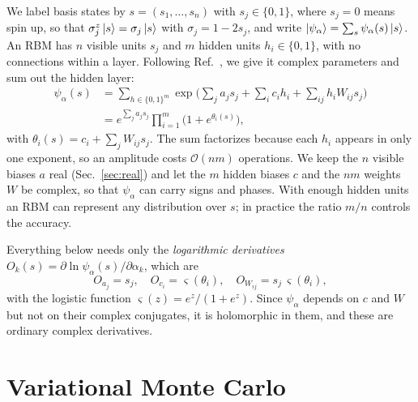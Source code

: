\documentclass[aps,prb,preprint,amsmath,amssymb,nofootinbib,longbibliography]{revtex4-2}
\begin{document}
We label basis states by $s = (s_1,\ldots,s_n)$ with $s_j \in \{0,1\}$, where $s_j = 0$ means spin up, so that
$\sigma^z_j\ket{s} = \sigma_j\ket{s}$ with $\sigma_j = 1 - 2s_j$, and write $\ket{\psi_\alpha} = \sum_s
\psi_\alpha(s)\ket{s}$. An RBM has $n$ visible units $s_j$ and $m$ hidden units $h_i \in \{0,1\}$, with no
connections within a layer. Following Ref.~, we give it complex parameters and sum out the
hidden layer:
\begin{align}
  \psi_\alpha(s) &= \sum_{h \in \{0,1\}^m} \exp\!\Big(\sum_j a_j s_j + \sum_i c_i h_i + \sum_{ij} h_i W_{ij} s_j \Big)
  \nonumber \\
  &= e^{\sum_j a_j s_j} \prod_{i=1}^{m} \big(1 + e^{\theta_i(s)}\big),
  \label{eq:rbm}
\end{align}
with $\theta_i(s) = c_i + \sum_{j} W_{ij} s_j$. The sum factorizes because each $h_i$ appears in only one exponent, so
an amplitude costs $\mathcal{O}(nm)$ operations. We keep the $n$ visible biases $a$ real (Sec.~\ref{sec:real}) and let
the $m$ hidden biases $c$ and the $nm$ weights $W$ be complex, so that $\psi_\alpha$ can carry signs and phases. With
enough hidden units an RBM can represent any distribution over $s$;\cite{leroux2008} in practice the ratio $m/n$
controls the accuracy.

Everything below needs only the \emph{logarithmic derivatives} $O_k(s) = \partial \ln\psi_\alpha(s)/\partial
\alpha_k$, which are
\begin{equation}
  O_{a_j} = s_j, \quad O_{c_i} = \varsigma(\theta_i), \quad O_{W_{ij}} = s_j\,\varsigma(\theta_i),
  \label{eq:logderiv}
\end{equation}
with the logistic function $\varsigma(z) = e^z/(1+e^z)$. Since $\psi_\alpha$ depends on $c$ and $W$ but not on their
complex conjugates, it is holomorphic in them, and these are ordinary complex derivatives.

\section{Variational Monte Carlo}
\label{sec:vmc}
\end{document}
